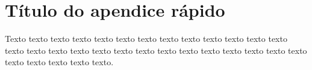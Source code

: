 \chapter{Título do apendice rápido }
\label{cap:ape}

Texto texto texto texto texto texto texto texto texto texto texto texto texto
texto texto texto texto texto texto texto texto texto texto texto texto texto
texto texto texto texto texto texto.

